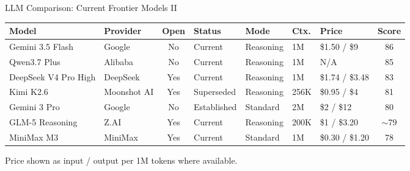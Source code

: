 \begin{frame}[shrink=5]{LLM Comparison: Current Frontier Models II}
\centering
\scriptsize
\begin{tabular}{p{3.0cm} p{1.6cm} c p{1.6cm} p{1.5cm} p{1.2cm} p{1.8cm} c}
\toprule
\textbf{Model} & \textbf{Provider} & \textbf{Open} & \textbf{Status} & \textbf{Mode} & \textbf{Ctx.} & \textbf{Price} & \textbf{Score} \\
\midrule
Gemini 3.5 Flash & Google & No & Current & Reasoning & 1M & \$1.50 / \$9 & 86 \\
Qwen3.7 Plus & Alibaba & No & Current & Reasoning & 1M & N/A & 85 \\
DeepSeek V4 Pro High & DeepSeek & Yes & Current & Reasoning & 1M & \$1.74 / \$3.48 & 83 \\
Kimi K2.6 & Moonshot AI & Yes & Superseded & Reasoning & 256K & \$0.95 / \$4 & 81 \\
Gemini 3 Pro & Google & No & Established & Standard & 2M & \$2 / \$12 & 80 \\
GLM-5 Reasoning & Z.AI & Yes & Current & Reasoning & 200K & \$1 / \$3.20 & $\sim$79 \\
MiniMax M3 & MiniMax & Yes & Current & Standard & 1M & \$0.30 / \$1.20 & 78 \\
\bottomrule
\end{tabular}

\vspace{0.4em}
{\tiny Price shown as input / output per 1M tokens where available.}
\end{frame}

